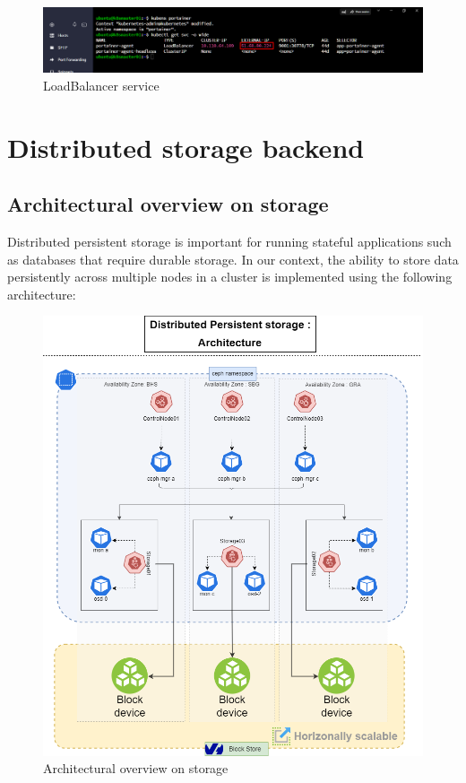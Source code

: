 \begin{enumerate}[label = (\alph*)]
\begin{itemize}[label={--}]
        \begin{figure}[H]\centering
        \includegraphics[width=1.0\textwidth,angle=00]{assets/f23.png}
        \caption{LoadBalancer service }
        \label{fig:LoadBalancer}
        \end{figure}
        
    \end{itemize}

\end{enumerate}

\section{Distributed storage backend}

\subsection{Architectural overview on storage}

Distributed persistent storage is important for running stateful applications such as databases that require durable storage. In our context, the ability to store data persistently across multiple nodes in a cluster is implemented using the following architecture: 

\begin{figure}[H]\centering
\includegraphics[width=1.0\textwidth,angle=00]{assets/f26.png}
\caption{Architectural overview on storage}
\label{fig:Architectural overview on storage}
\end{figure}

